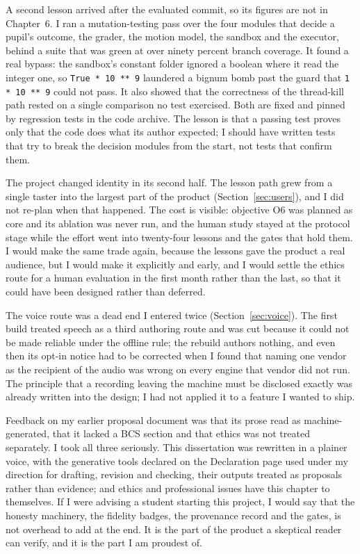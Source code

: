 \documentclass[11pt,a4paper]{report}
\begin{document}
A second lesson arrived after the evaluated commit, so its figures are not in Chapter~6. I ran a mutation-testing pass over the four modules that decide a pupil's outcome, the grader, the motion model, the sandbox and the executor, behind a suite that was green at over ninety percent branch coverage. It found a real bypass: the sandbox's constant folder ignored a boolean where it read the integer one, so \texttt{True * 10 ** 9} laundered a bignum bomb past the guard that \texttt{1 * 10 ** 9} could not pass. It also showed that the correctness of the thread-kill path rested on a single comparison no test exercised. Both are fixed and pinned by regression tests in the code archive. The lesson is that a passing test proves only that the code does what its author expected; I should have written tests that try to break the decision modules from the start, not tests that confirm them.

The project changed identity in its second half. The lesson path grew from a single taster into the largest part of the product (Section~\ref{sec:users}), and I did not re-plan when that happened. The cost is visible: objective O6 was planned as core and its ablation was never run, and the human study stayed at the protocol stage while the effort went into twenty-four lessons and the gates that hold them. I would make the same trade again, because the lessons gave the product a real audience, but I would make it explicitly and early, and I would settle the ethics route for a human evaluation in the first month rather than the last, so that it could have been designed rather than deferred.

The voice route was a dead end I entered twice (Section~\ref{sec:voice}). The first build treated speech as a third authoring route and was cut because it could not be made reliable under the offline rule; the rebuild authors nothing, and even then its opt-in notice had to be corrected when I found that naming one vendor as the recipient of the audio was wrong on every engine that vendor did not run. The principle that a recording leaving the machine must be disclosed exactly was already written into the design; I had not applied it to a feature I wanted to ship.

Feedback on my earlier proposal document was that its prose read as machine-generated, that it lacked a BCS section and that ethics was not treated separately. I took all three seriously. This dissertation was rewritten in a plainer voice, with the generative tools declared on the Declaration page used under my direction for drafting, revision and checking, their outputs treated as proposals rather than evidence; and ethics and professional issues have this chapter to themselves. If I were advising a student starting this project, I would say that the honesty machinery, the fidelity badges, the provenance record and the gates, is not overhead to add at the end. It is the part of the product a skeptical reader can verify, and it is the part I am proudest of.
\end{document}
